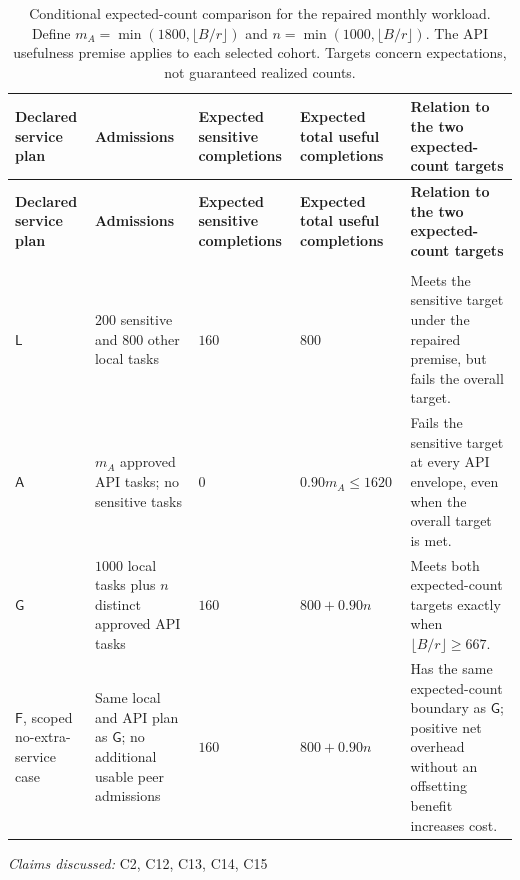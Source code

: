 \documentclass[11pt]{article}
\begin{document}
\begin{landscape}
\small
\begin{longtable}{@{}>{\raggedright\arraybackslash}p{}>{\raggedright\arraybackslash}p{}>{\raggedleft\arraybackslash}p{}>{\raggedright\arraybackslash}p{}>{\raggedright\arraybackslash}p{}@{}}
\caption{Conditional expected-count comparison for the repaired monthly workload. Define $m_A=\min(1800,\lfloor B/r\rfloor)$ and $n=\min(1000,\lfloor B/r\rfloor)$. The API usefulness premise applies to each selected cohort. Targets concern expectations, not guaranteed realized counts.}\\
\toprule
\textbf{Declared service plan} & \textbf{Admissions} & \textbf{Expected sensitive completions} & \textbf{Expected total useful completions} & \textbf{Relation to the two expected-count targets}\\
\midrule
\endfirsthead
\toprule
\textbf{Declared service plan} & \textbf{Admissions} & \textbf{Expected sensitive completions} & \textbf{Expected total useful completions} & \textbf{Relation to the two expected-count targets}\\
\midrule
\endhead
\midrule
\multicolumn{5}{r}{\footnotesize Continued on next page}\\
\endfoot
\bottomrule
\endlastfoot
$\mathsf{L}$ & $200$ sensitive and $800$ other local tasks & $160$ & $800$ & Meets the sensitive target under the repaired premise, but fails the overall target.\\
$\mathsf{A}$ & $m_A$ approved API tasks; no sensitive tasks & $0$ & $0.90m_A\leq1620$ & Fails the sensitive target at every API envelope, even when the overall target is met.\\
$\mathsf{G}$ & $1000$ local tasks plus $n$ distinct approved API tasks & $160$ & $800+0.90n$ & Meets both expected-count targets exactly when $\lfloor B/r\rfloor\geq667$.\\
$\mathsf{F}$, scoped no-extra-service case & Same local and API plan as $\mathsf{G}$; no additional usable peer admissions & $160$ & $800+0.90n$ & Has the same expected-count boundary as $\mathsf{G}$; positive net overhead without an offsetting benefit increases cost.\\
\end{longtable}
\par{}
\end{landscape}
\textit{Claims discussed: }C2, C12, C13, C14, C15
\end{document}
